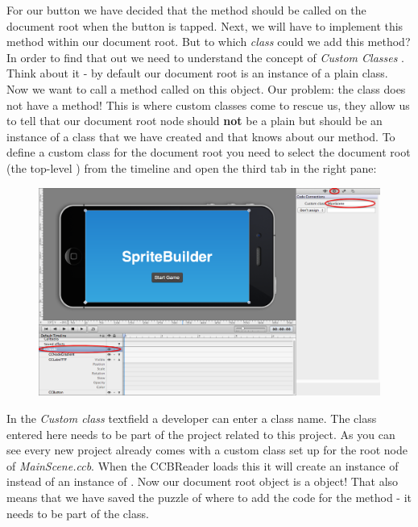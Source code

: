 For our button we have decided that the  method should be
called on the document root when the button is tapped. Next, we will have to
implement this  method within our document root. But to
which \textit{class} could we add this method? In order to find that out we need to understand the
concept of \textit{Custom Classes} .
Think about it - by default our document root is an instance of a plain
\ccnode{} class.
Now we want to call a method called  on this object. Our
problem: the \ccnode{} class does not have a  method! This
is where custom classes come to rescue us, they allow us to tell \SB{} that our
document root node should \textbf{not} be a plain \ccnode{} but should be an
instance of a class that we have created and that knows about our
 method. To define a custom class for the document root
you need to select the document root (the top-level \ccnode{}) from the timeline
and open the third tab in the right pane:

\begin{figure}[H]
		\centering
		\includegraphics[width=0.9\linewidth]{images/firstproject/custom_class.png}
\end{figure}

In the \textit{Custom class} textfield a developer can enter a class name. The
class entered here needs to be part of the \xcode{} project related to this
\SB{} project. As you can see every new \SB{} project already comes with a
custom class set up for the root node of \textit{MainScene.ccb}. When the
CCBReader loads this \ccbfile{} it will create an instance of  instead of an instance of
.
Now our document root object is a  object! That also means
that we have saved the puzzle of where to add the code for the
 method - it needs to be part of the
 class.

